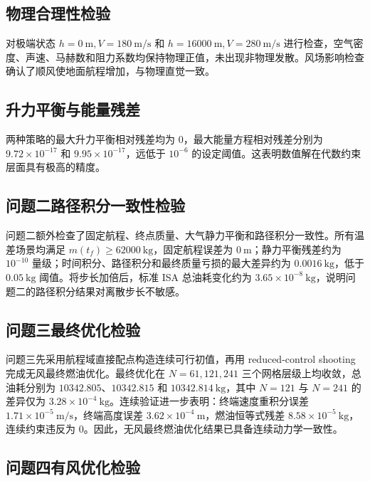\documentclass[withoutpreface,bwprint]{cumcmthesis}
\begin{document}
\subsection{物理合理性检验}

对极端状态 $h=0\ \mathrm{m}, V=180\ \mathrm{m/s}$ 和 $h=16000\ \mathrm{m}, V=280\ \mathrm{m/s}$ 进行检查，空气密度、声速、马赫数和阻力系数均保持物理正值，未出现非物理发散。风场影响检查确认了顺风使地面航程增加，与物理直觉一致。

\subsection{升力平衡与能量残差}

两种策略的最大升力平衡相对残差均为 $0$，最大能量方程相对残差分别为 $9.72\times 10^{-17}$ 和 $9.95\times 10^{-17}$，远低于 $10^{-6}$ 的设定阈值。这表明数值解在代数约束层面具有极高的精度。

\subsection{问题二路径积分一致性检验}

问题二额外检查了固定航程、终点质量、大气静力平衡和路径积分一致性。所有温差场景均满足 $m(t_f)\geq62000\ \mathrm{kg}$，固定航程误差为 $0\ \mathrm{m}$；静力平衡残差约为 $10^{-10}$ 量级；时间积分、路径积分和最终质量亏损的最大差异约为 $0.0016\ \mathrm{kg}$，低于 $0.05\ \mathrm{kg}$ 阈值。将步长加倍后，标准 ISA 总油耗变化约为 $3.65\times10^{-8}\ \mathrm{kg}$，说明问题二的路径积分结果对离散步长不敏感。

\subsection{问题三最终优化检验}

问题三先采用航程域直接配点构造连续可行初值，再用 reduced-control shooting 完成无风最终燃油优化。最终优化在 $N=61,121,241$ 三个网格层级上均收敛，总油耗分别为 $10342.805$、$10342.815$ 和 $10342.814\ \mathrm{kg}$，其中 $N=121$ 与 $N=241$ 的差异仅为 $3.28\times10^{-4}\ \mathrm{kg}$。连续验证进一步表明：终端速度重积分误差 $1.71\times10^{-5}\ \mathrm{m/s}$，终端高度误差 $3.62\times10^{-4}\ \mathrm{m}$，燃油恒等式残差 $8.58\times10^{-5}\ \mathrm{kg}$，连续约束违反为 $0$。因此，无风最终燃油优化结果已具备连续动力学一致性。

\subsection{问题四有风优化检验}
\end{document}
